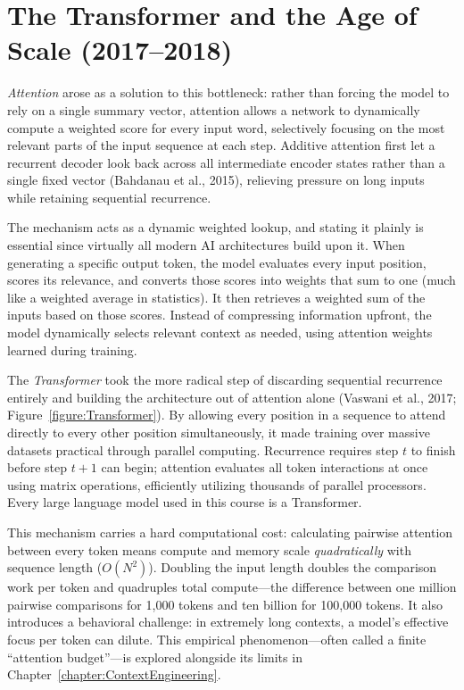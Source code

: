 \section{The Transformer and the Age of Scale (2017--2018)}
\label{section:TransformerEra}

\emph{Attention} arose as a solution to this bottleneck: rather than forcing the model to rely on a single summary vector, attention allows a network to dynamically compute a weighted score for every input word, selectively focusing on the most relevant parts of the input sequence at each step. 
Additive attention first let a recurrent decoder look back across all intermediate encoder states rather than a single fixed vector (Bahdanau et al., 2015), relieving pressure on long inputs while retaining sequential recurrence.

The mechanism acts as a dynamic weighted lookup, and stating it plainly is essential since virtually all modern AI architectures build upon it. 
When generating a specific output token, the model evaluates every input position, scores its relevance, and converts those scores into weights that sum to one (much like a weighted average in statistics). 
It then retrieves a weighted sum of the inputs based on those scores. 
Instead of compressing information upfront, the model dynamically selects relevant context as needed, using attention weights learned during training.

The \emph{Transformer} took the more radical step of discarding sequential recurrence entirely and building the architecture out of attention alone (Vaswani et al., 2017; Figure~\ref{figure:Transformer}). 
By allowing every position in a sequence to attend directly to every other position simultaneously, it made training over massive datasets practical through parallel computing. 
Recurrence requires step $t$ to finish before step $t+1$ can begin; attention evaluates all token interactions at once using matrix operations, efficiently utilizing thousands of parallel processors. 
Every large language model used in this course is a Transformer.

This mechanism carries a hard computational cost: calculating pairwise attention between every token means compute and memory scale \emph{quadratically} with sequence length ($O(N^2)$). 
Doubling the input length doubles the comparison work per token and quadruples total compute—the difference between one million pairwise comparisons for 1,000 tokens and ten billion for 100,000 tokens. 
It also introduces a behavioral challenge: in extremely long contexts, a model's effective focus per token can dilute. 
This empirical phenomenon—often called a finite ``attention budget''—is explored alongside its limits in Chapter~\ref{chapter:ContextEngineering}.


